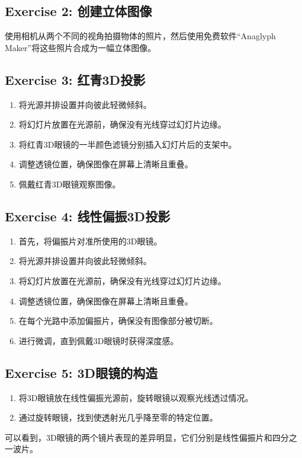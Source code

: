 \documentclass{ctexart}
\begin{document}
\subsection{Exercise 2: 创建立体图像}
使用相机从两个不同的视角拍摄物体的照片，然后使用免费软件“Anaglyph Maker”将这些照片合成为一幅立体图像。

\subsection{Exercise 3: 红青3D投影}
\begin{enumerate}
    \item 将光源并排设置并向彼此轻微倾斜。
    \item 将幻灯片放置在光源前，确保没有光线穿过幻灯片边缘。
    \item 将红青3D眼镜的一半颜色滤镜分别插入幻灯片后的支架中。
    \item 调整透镜位置，确保图像在屏幕上清晰且重叠。
    \item 佩戴红青3D眼镜观察图像。
\end{enumerate}

\subsection{Exercise 4: 线性偏振3D投影}
\begin{enumerate}
    \item 首先，将偏振片对准所使用的3D眼镜。
    \item 将光源并排设置并向彼此轻微倾斜。
    \item 将幻灯片放置在光源前，确保没有光线穿过幻灯片边缘。
    \item 调整透镜位置，确保图像在屏幕上清晰且重叠。
    \item 在每个光路中添加偏振片，确保没有图像部分被切断。
    \item 进行微调，直到佩戴3D眼镜时获得深度感。
\end{enumerate}

\subsection{Exercise 5: 3D眼镜的构造}
\begin{enumerate}
    \item 将3D眼镜放在线性偏振光源前，旋转眼镜以观察光线透过情况。
    \item 通过旋转眼镜，找到使透射光几乎降至零的特定位置。
\end{enumerate}
可以看到，3D眼镜的两个镜片表现的差异明显，它们分别是线性偏振片和四分之一波片。
\end{document}
